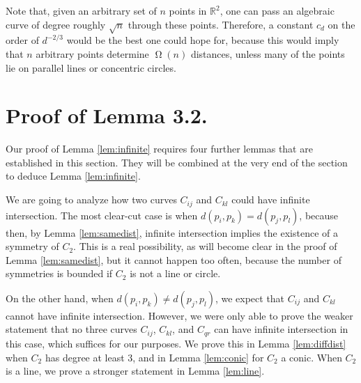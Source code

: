 \documentclass[12pt]{article}
\newcommand{\RR}{\mathbb R}
\begin{document}
 Note that, given an arbitrary set of $n$ points in $\RR^2$,
 one can pass an algebraic curve of degree roughly $\sqrt{n}$ through these points.
 Therefore, a constant $c_d$ on the order of $d^{-2/3}$ would be the best one could hope for,
 because this would imply that $n$ arbitrary points determine $\upOmega(n)$ distances,
 unless many of the points lie on parallel lines or concentric circles.
 
 

\section{Proof of Lemma 3.2.}%
\label{sec:infinite}
Our proof of Lemma \ref{lem:infinite} requires four further lemmas that are established in this section.
They will be combined at the very end of the section to deduce Lemma \ref{lem:infinite}.
 
We are going to analyze how two curves $C_{ij}$ and $C_{kl}$ could have infinite intersection.
The most clear-cut case is when $d(p_i, p_k) = d(p_j, p_l)$, 
because then, by Lemma \ref{lem:samedist}, infinite intersection implies the existence of a symmetry of $C_2$. 
This is a real possibility, as will become clear in the proof of Lemma \ref{lem:samedist},
but it cannot happen too often,
because the number of symmetries is bounded if $C_2$ is not a line or circle.
  
On the other hand, when $d(p_i, p_k) \neq d(p_j, p_l)$, 
we expect that $C_{ij}$ and $C_{kl}$ cannot have infinite intersection.
However, we were only able to prove the weaker statement 
that no three curves $C_{ij}$, $C_{kl}$, and $C_{qr}$ can have infinite intersection in this case,
which suffices for our purposes.
We prove this in Lemma \ref{lem:diffdist} when $C_2$ has degree at least 3, and in Lemma \ref{lem:conic} for $C_2$ a conic.
When $C_2$ is a line, we prove a stronger statement in Lemma \ref{lem:line}.
\end{document}
